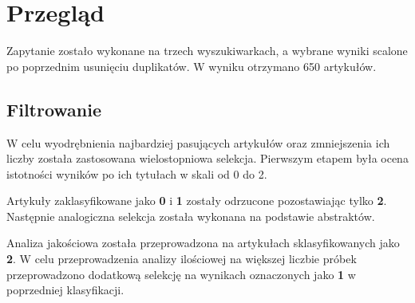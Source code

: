 \section{Przegląd}
Zapytanie zostało wykonane na trzech wyszukiwarkach, a wybrane wyniki scalone po poprzednim usunięciu duplikatów. W wyniku otrzymano 650 artykułów.

\subsection{Filtrowanie}
W celu wyodrębnienia najbardziej pasujących artykułów oraz zmniejszenia ich liczby została zastosowana wielostopniowa selekcja. Pierwszym etapem była ocena istotności wyników po ich tytułach w skali od 0 do 2.

Artykuły zaklasyfikowane jako {\bf0} i {\bf1} zostały odrzucone pozostawiając tylko {\bf2}. Następnie analogiczna selekcja została wykonana na podstawie abstraktów.

Analiza jakościowa została przeprowadzona na artykułach sklasyfikowanych jako \textbf{2}. W celu przeprowadzenia analizy ilościowej na większej liczbie próbek przeprowadzono dodatkową selekcję na wynikach oznaczonych jako \textbf{1} w poprzedniej klasyfikacji.


